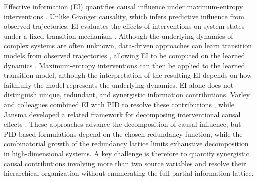 \documentclass[fleqn,10pt]{wlscirep}
\theoremstyle{naturetheorem}
\begin{document}



Effective information (EI) quantifies causal influence under maximum-entropy interventions \cite{Hoel2013QuantifyingCE,Hoel2017WhenTM,Tononi2003MeasuringII,Yuan2024EmergenceAC}. Unlike Granger causality, which infers predictive influence from observed trajectories, EI evaluates the effects of interventions on system states under a fixed transition mechanism \cite{Pearl2009CausalII}. Although the underlying dynamics of complex systems are often unknown, data-driven approaches can learn transition models from observed trajectories \cite{Schmid2010DMD,Brunton2016SINDy,Chen2018NeuralODE}, allowing EI to be computed on the learned dynamics \cite{Yang2025FindingEI}. Maximum-entropy interventions can then be applied to the learned transition model, although the interpretation of the resulting EI depends on how faithfully the model represents the underlying dynamics. EI alone does not distinguish unique, redundant, and synergistic information contributions. Varley and colleagues combined EI with PID to resolve these contributions \cite{Varley2022UntanglingSynergisticEffects,Varley2024Synergistic}, while Jansma developed a related framework for decomposing interventional causal effects \cite{Jansma2025DecomposingInterventionalCausality}. These approaches advance the decomposition of causal influence, but PID-based formulations depend on the chosen redundancy function, while the combinatorial growth of the redundancy lattice limits exhaustive decomposition in high-dimensional systems. A key challenge is therefore to quantify synergistic causal contributions involving more than two source variables and resolve their hierarchical organization without enumerating the full partial-information lattice.
\end{document}
